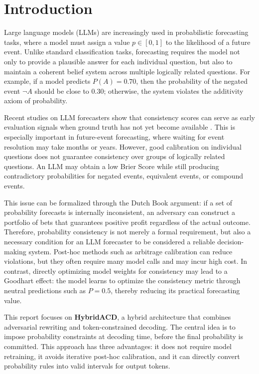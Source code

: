 \documentclass[pdflatex,sn-mathphys-num]{sn-jnl}
\begin{document}
\section{Introduction}\label{sec:intro}

Large language models (LLMs) are increasingly used in probabilistic forecasting tasks, where a model must assign a value $p \in [0,1]$ to the likelihood of a future event. Unlike standard classification tasks, forecasting requires the model not only to provide a plausible answer for each individual question, but also to maintain a coherent belief system across multiple logically related questions. For example, if a model predicts $P(A)=0.70$, then the probability of the negated event $\neg A$ should be close to $0.30$; otherwise, the system violates the additivity axiom of probability.

Recent studies on LLM forecasters show that consistency scores can serve as early evaluation signals when ground truth has not yet become available \cite{ref1}. This is especially important in future-event forecasting, where waiting for event resolution may take months or years. However, good calibration on individual questions does not guarantee consistency over groups of logically related questions. An LLM may obtain a low Brier Score while still producing contradictory probabilities for negated events, equivalent events, or compound events.

This issue can be formalized through the Dutch Book argument: if a set of probability forecasts is internally inconsistent, an adversary can construct a portfolio of bets that guarantees positive profit regardless of the actual outcome. Therefore, probability consistency is not merely a formal requirement, but also a necessary condition for an LLM forecaster to be considered a reliable decision-making system. Post-hoc methods such as arbitrage calibration can reduce violations, but they often require many model calls and may incur high cost. In contrast, directly optimizing model weights for consistency may lead to a Goodhart effect: the model learns to optimize the consistency metric through neutral predictions such as $P=0.5$, thereby reducing its practical forecasting value.

This report focuses on \textbf{HybridACD}, a hybrid architecture that combines adversarial rewriting and token-constrained decoding. The central idea is to impose probability constraints at decoding time, before the final probability is committed. This approach has three advantages: it does not require model retraining, it avoids iterative post-hoc calibration, and it can directly convert probability rules into valid intervals for output tokens.
\end{document}
